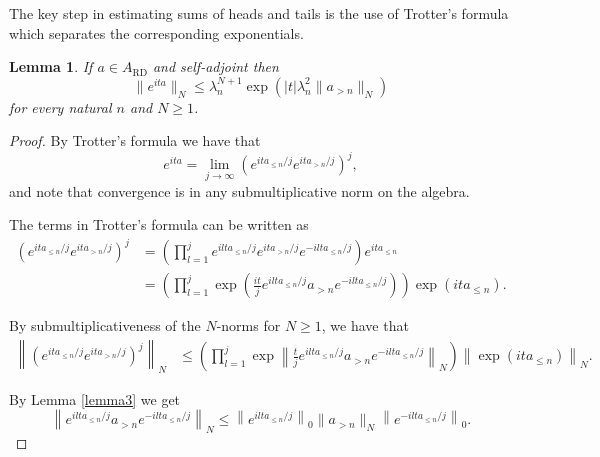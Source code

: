 \documentclass[12pt,reqno]{amsart}
\numberwithin{equation}{section}
\newtheorem{lem}[theo]{{\sc \bf Lemma}}
\begin{document}
The key step in estimating sums of heads and tails is the use of Trotter's formula which separates the corresponding exponentials.

\begin{lem}\label{lemma4}
If $a\in A_\textrm{RD}$ and self-adjoint then 
\begin{equation*}
\|e^{ita}\|_{N} \le \lambda_n^{N+1} \exp\left(|t|\lambda_n^2 \|a_{> n}\|_{N}\right)
\end{equation*}
for every natural $n$ and $N\ge1$.
\end{lem}
\begin{proof}
By Trotter's formula we have that
\begin{equation*}
e^{ita} = \lim\limits_{j\to\infty} \left(e^{ita_{\leq n}/j}e^{ita_{> n}/j}\right)^j,
\end{equation*}
and note that convergence is in any submultiplicative norm on the algebra.

The terms in Trotter's formula can be written as 
\begin{equation*}\begin{aligned}
\left(e^{ita_{\leq n}/j} e^{ita_{> n}/j}\right)^j &= \left(\prod_{l=1}^j e^{ilta_{\le n}/j}e^{ita_{>n}/j} e^{-ilta_{\le n}/j}\right) e^{ita_{\le n}} \\&=\left(\prod_{l=1}^j \exp\left(\frac{it}{j} e^{ilta_{\le n}/j} a_{>n} e^{-ilta_{\le n}/j}\right)\right) \exp\left(ita_{\le n}\right).
\end{aligned}
\end{equation*}

By submultiplicativeness of the $N$-norms for $N\ge1$, we have that
\begin{equation*}
\begin{aligned}
\left\|\left(e^{ita_{\leq n}/j}e^{ita_{> n}/j}\right)^j\right\|_{N}  &\le
\left(\prod_{l=1}^j \exp\left\|\frac{t}{j} e^{ilta_{\le n}/j} a_{>n} e^{-ilta_{\le n}/j}\right\|_{N}\right) \left\|\exp\left(ita_{\le n}\right)\right\|_{N}.
\end{aligned}
\end{equation*}

By Lemma \ref{lemma3} we get 
\begin{equation*}
\left\| e^{ilta_{\le n}/j} a_{>n} e^{-ilta_{\le n}/j}\right\|_{N} \le \left\|e^{ilta_{\le n}/j}\right\|_{0} \|a_{>n}\|_{N} \left\|e^{-ilta_{\le n}/j}\right\|_{0}.
\end{equation*}


\end{proof}
\end{document}
